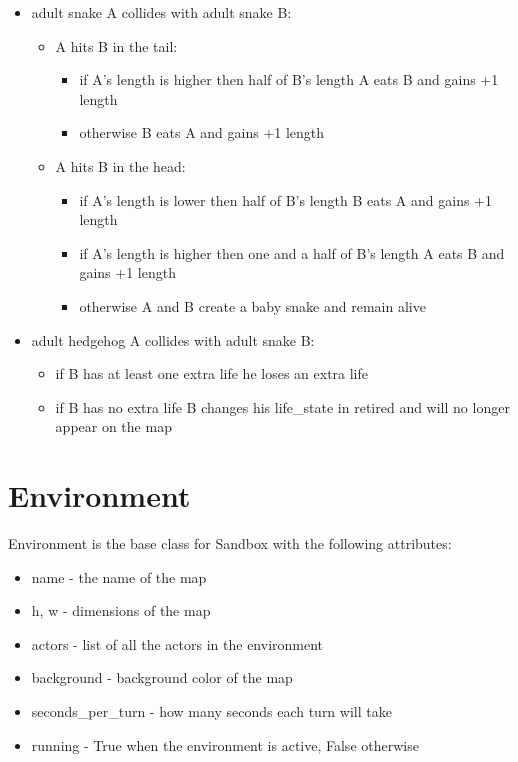    \begin{itemize}
        \item {
            adult snake A collides with adult snake B:
            \begin{itemize}
                \item A hits B in the tail: 
                \begin{itemize}
                    \item if A's length is higher then half of B's length A eats B and gains +1 length
                    \item otherwise B eats A and gains +1 length
                \end{itemize}
                
                \item A hits B in the head:
                \begin{itemize}
                    \item if A's length is lower then half of B's length B eats A and gains +1 length
                    \item if A's length is higher then one and a half of B's length A eats B and gains +1 length
                    \item otherwise A and B create a baby snake and remain alive
                \end{itemize}
            \end{itemize}
        }
        
        \item {
            adult hedgehog A collides with adult snake B:
            \begin{itemize}
                \item if B has at least one extra life he loses an extra life
                
                \item if B has no extra life B changes his life\_state in retired and will no longer appear on the map
            \end{itemize}
        }
        
    \end{itemize}

\section{\Large Environment}
    Environment is the base class for Sandbox with the following attributes:
    \begin{itemize}
        \item name - the name of the map
        \item h, w - dimensions of the map
        \item actors - list of all the actors in the environment
        \item background - background color of the map
        \item seconds\_per\_turn - how many seconds each turn will take
        \item running - True when the environment is active, False otherwise
    \end{itemize}

